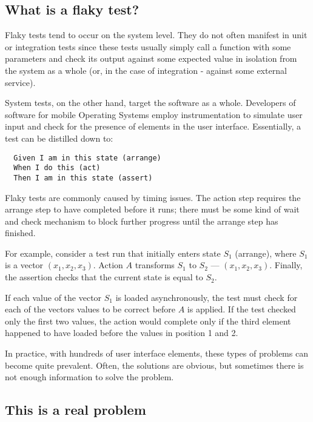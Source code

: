 \subsection{What is a flaky test?}
Flaky tests tend to occur on the system level. They do not often manifest in unit or integration tests since these tests usually simply call a function with some parameters and check its output against some expected value in isolation from the system as a whole (or, in the case of integration - against some external service).

System tests, on the other hand, target the software as a whole. Developers of software for mobile Operating Systems employ instrumentation to simulate user input and check for the presence of elements in the user interface. Essentially, a test can be distilled down to:
\begin{verbatim}
  Given I am in this state (arrange)
  When I do this (act)
  Then I am in this state (assert)
\end{verbatim}

Flaky tests are commonly caused by timing issues. The action step requires the arrange step to have completed before it runs; there must be some kind of wait and check mechanism to block further progress until the arrange step has finished.

For example, consider a test run that initially enters state $S_{1}$ (arrange), where $S_{1}$ is a vector $(x_{1},x_{2},x_{3})$. Action $A$ transforms $S_1$ to $S_2$ --- $(x_{1},x_{2},x_{3})$. Finally, the assertion checks that the current state is equal to $S_2$.

If each value of the vector $S_{1}$ is loaded asynchronously, the test must check for each of the vectors values to be correct before $A$ is applied. If the test checked only the first two values, the action would complete only if the third element happened to have loaded before the values in position 1 and 2.

In practice, with hundreds of user interface elements, these types of problems can become quite prevalent. Often, the solutions are obvious, but sometimes there is not enough information to solve the problem.

\subsection{This is a real problem}

